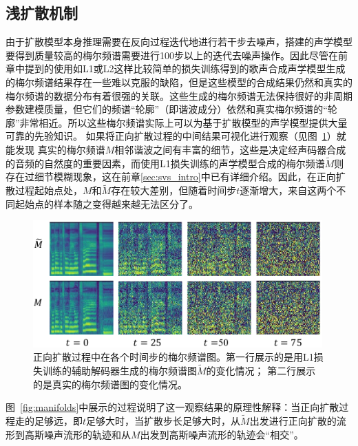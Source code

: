 \subsection{浅扩散机制}
\label{sec:shallow_mechanism}
由于扩散模型本身推理需要在反向过程迭代地进行若干步去噪声，搭建的声学模型要得到质量较高的梅尔频谱需要进行100步以上的迭代去噪声操作。因此尽管在前章中提到的使用如L1或L2这样比较简单的损失训练得到的歌声合成声学模型生成的梅尔频谱结果存在一些难以克服的缺陷，但是这些模型的合成结果仍然和真实的梅尔频谱的数据分布有着很强的关联。这些生成的梅尔频谱无法保持很好的非周期参数建模质量，但它们的频谱``轮廓''（即谐波成分）依然和真实梅尔频谱的``轮廓''非常相近。所以这些梅尔频谱实际上可以为基于扩散模型的声学模型提供大量可靠的先验知识。
如果将正向扩散过程的中间结果可视化进行观察（见图~\ref{fig:fake_real_mels_diffusion}）就能发现
真实的梅尔频谱$M$相邻谐波之间有丰富的细节，这些是决定经声码器合成的音频的自然度的重要因素，而使用L1损失训练的声学模型合成的梅尔频谱$\widetilde{M}$则存在过细节模糊现象，这在前章\ref{sec:svs_intro}中已有详细介绍。因此，在正向扩散过程起始点处，$M$和$\widetilde{M}$存在较大差别，但随着时间步$t$逐渐增大，来自这两个不同起始点的样本随之变得越来越无法区分了。
\begin{figure}[!h]
    \centering
    \includegraphics[width=0.99\textwidth,]{figure/svs/fake_real_mel.pdf}
    \caption{正向扩散过程中在各个时间步的梅尔频谱图。第一行展示的是用L1损失训练的辅助解码器生成的梅尔频谱图$\widetilde{M}$的变化情况； 第二行展示的是真实的梅尔频谱图的变化情况。}
    \label{fig:fake_real_mels_diffusion}
\end{figure}
图~\ref{fig:manifolds}中展示的过程说明了这一观察结果的原理性解释：当正向扩散过程走的足够远，即$t$足够大时，当扩散步长足够大时，从$\widetilde{M}$出发进行正向扩散的流形到高斯噪声流形的轨迹和从$M$出发到高斯噪声流形的轨迹会``相交''。
